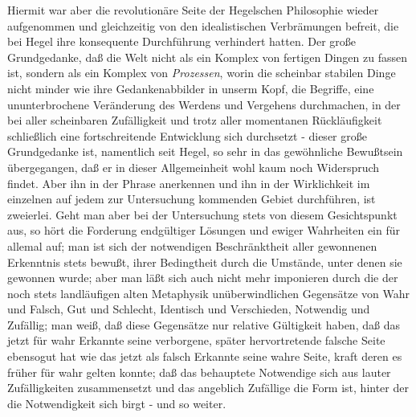 Hiermit war aber die revolutionäre Seite der Hegelschen
Philosophie wieder aufgenommen und gleichzeitig von den idealistischen
Verbrämungen befreit, die bei Hegel ihre konsequente Durchführung
verhindert hatten. Der große Grundgedanke, daß die Welt nicht als ein
Komplex von fertigen Dingen zu fassen ist, sondern als ein Komplex
von \emph{Prozessen}, worin die scheinbar stabilen Dinge nicht minder
wie ihre Gedankenabbilder in unserm Kopf, die Begriffe, eine
ununterbrochene Veränderung des Werdens und Vergehens durchmachen, in
der bei aller scheinbaren Zufälligkeit und trotz aller momentanen
Rückläufigkeit schließlich eine fortschreitende Entwicklung sich
durchsetzt - dieser große Grundgedanke ist, namentlich seit Hegel, so
sehr in das gewöhnliche Bewußtsein übergegangen, daß er in dieser
Allgemeinheit wohl kaum noch Widerspruch findet. Aber ihn in der Phrase
anerkennen und ihn in der Wirklichkeit im einzelnen auf jedem zur
Untersuchung kommenden Gebiet durchführen, ist zweierlei. Geht man aber
bei der Untersuchung stets von diesem Gesichtspunkt aus, so hört die
Forderung endgültiger Lösungen und ewiger Wahrheiten ein für allemal
auf; man ist sich der notwendigen Beschränktheit aller gewonnenen
Erkenntnis stets bewußt, ihrer Bedingtheit durch die Umstände, unter
denen sie gewonnen wurde; aber man läßt sich auch nicht mehr imponieren
durch die der noch stets landläufigen alten Metaphysik unüberwindlichen
Gegensätze von Wahr und Falsch,
Gut und Schlecht, Identisch und Verschieden, Notwendig und Zufällig; man
weiß, daß diese Gegensätze nur relative Gültigkeit haben, daß das jetzt
für wahr Erkannte seine verborgene, später hervortretende falsche Seite
ebensogut hat wie das jetzt als falsch Erkannte seine wahre Seite, kraft
deren es früher für wahr gelten konnte; daß das behauptete Notwendige
sich aus lauter Zufälligkeiten zusammensetzt und das angeblich Zufällige
die Form ist, hinter der die Notwendigkeit sich birgt - und so weiter.

